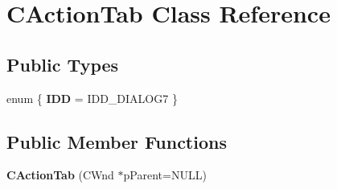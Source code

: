 \hypertarget{class_c_action_tab}{\section{C\-Action\-Tab Class Reference}
\label{class_c_action_tab}
}
\subsection*{Public Types}
\begin{DoxyCompactItemize}
\item 
enum \{ {\bfseries I\-D\-D} =  I\-D\-D\-\_\-\-D\-I\-A\-L\-O\-G7
 \}
\end{DoxyCompactItemize}
\subsection*{Public Member Functions}
\begin{DoxyCompactItemize}
\item 
\hypertarget{class_c_action_tab_a8ed0108b5b10ec37baba6dd52c5a0112}{{\bfseries C\-Action\-Tab} (C\-Wnd $\ast$p\-Parent=N\-U\-L\-L)}\label{class_c_action_tab_a8ed0108b5b10ec37baba6dd52c5a0112}

\end{DoxyCompactItemize}
